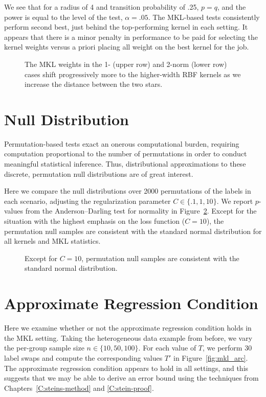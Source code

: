 We see that for a radius of 4 and transition probability of .25, $p=q$, and the power
is equal to the level of the test, $\alpha = .05$.  The MKL-based tests consistently
perform second best, just behind the top-performing kernel in each setting.  It appears
that there is a minor penalty in performance to be paid for selecting the kernel
weights versus a priori placing all weight on the best kernel for the job.
\begin{figure}
  \begin{center}
    \resizebox{14.0cm}{!}{
      
    }
  \end{center}
\caption{The MKL weights in the 1- (upper row) and 2-norm (lower row) cases shift progressively more to
  the higher-width RBF kernels as we increase the distance between the two stars.}
\label{fig:mkl_power}
\end{figure}

\section{Null Distribution}
Permutation-based tests exact an onerous computational burden, requiring computation
proportional to the number of permutations in order to conduct meaningful statistical
inference.  Thus, distributional approximations to these discrete, permutation null
distributions are of great interest.

Here we compare the null distributions over 2000 permutations of the labels in each scenario,
adjusting the regularization parameter $C \in \{.1, 1, 10\}$.  We report $p$-values
from the Anderson--Darling test for normality in Figure~\ref{fig:mkl_null}.  Except for
the situation with the highest emphasis on the loss function ($C=10$), the
permutation null samples are consistent with the standard normal distribution for all kernels
and MKL statistics.
\begin{figure}
  \begin{center}
    \resizebox{14.0cm}{!}{
      
    }
  \end{center}
\caption{Except for $C=10$, permutation null samples are consistent with the standard normal distribution.}
\label{fig:mkl_null}
\end{figure}

\section{Approximate Regression Condition}
Here we examine whether or not the approximate regression condition
holds in the MKL setting.
Taking the heterogeneous data example from before, we vary the
per-group sample size $n \in \{10, 50, 100\}$.  For each value of $T$,
we perform $30$ label swaps and compute the corresponding values $T'$
in Figure~\ref{fig:mkl_arc}.  The approximate regression condition
appears to hold in all settings, and this suggests that we may be able to derive
an error bound using the techniques from
Chapters~\ref{C:steins-method} and \ref{C:stein-proof}.

